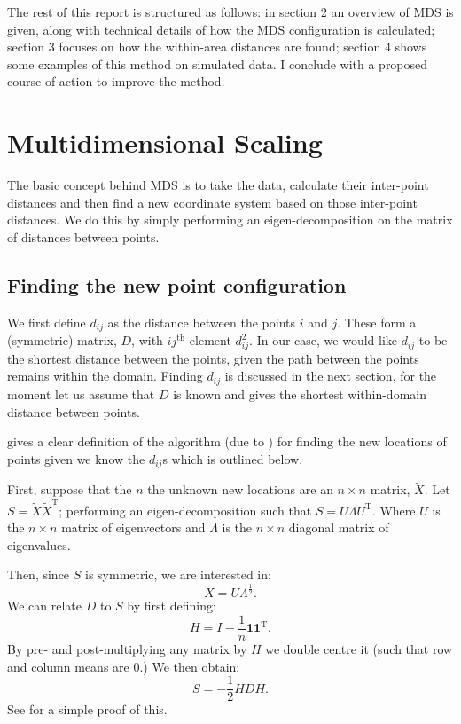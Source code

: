 \documentclass[a4paper,10pt]{article}
\newcommand{\tr}[1]{#1^{\text{T}}}
\newcommand{\cross}{\times}
\begin{document}
The rest of this report is structured as follows: in section 2 an overview of MDS is given, along with technical details of how the MDS configuration is calculated; section 3 focuses on how the within-area distances are found; section 4 shows some examples of this method on simulated data. I conclude with a proposed course of action to improve the method.

\section{Multidimensional Scaling}

The basic concept behind MDS is to take the data, calculate their inter-point distances and then find a new coordinate system based on those inter-point distances. We do this by simply performing an eigen-decomposition on the matrix of distances between points.

\subsection{Finding the new point configuration}

We first define $d_{ij}$ as the distance between the points $i$ and $j$. These form a (symmetric) matrix, $D$, with $ij^{\text{th}}$ element $d^2_{ij}$. In our case, we would like $d_{ij}$ to be the shortest distance between the points, given the path between the points remains within the domain. Finding $d_{ij}$ is discussed in the next section, for the moment let us assume that $D$ is known and gives the shortest within-domain distance between points.

\cite{diaconis08} gives a clear definition of the algorithm (due to \cite{schoenberg35}) for finding the new locations of points given we know the $d_{ij}$s which is outlined below.

First, suppose that the $n$ the unknown new locations are an $n \times n$ matrix, $\tilde{X}$. Let $S=\tilde{X}\tr{\tilde{X}}$; performing an eigen-decomposition such that $S=U\Lambda\tr{U}$. Where $U$ is the $n \cross n$ matrix of eigenvectors and $\Lambda$ is the $n \cross n$ diagonal matrix of eigenvalues.

Then, since $S$ is symmetric, we are interested in:
\begin{equation}
\tilde{X}=U\Lambda^{\frac{1}{2}}.
\end{equation}
We can relate $D$ to $S$ by first defining:
\begin{equation}
H = I-\frac{1}{n}\mathbf{1}\tr{\mathbf{1}}.
\end{equation}
By pre- and post-multiplying any matrix by $H$ we double centre it (such that row and column means are 0.) We then obtain:
\begin{equation}
S = -\frac{1}{2}HDH.
\end{equation}
See \cite{diaconis08} for a simple proof of this.
\end{document}
